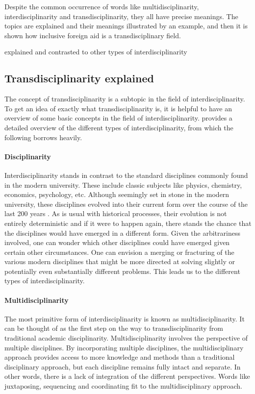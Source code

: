 \documentclass[a4paper]{article}
\begin{document}
Despite the common occurrence of words like multidisciplinarity,
interdisciplinarity and transdisciplinarity, they all have precise meanings.
The topics are explained and their meanings illustrated by an example, and
then it is shown how inclusive foreign aid is a transdisciplinary field.

explained and contrasted to other types
of interdisciplinarity 

\subsection{Transdisciplinarity explained}

The concept of transdisciplinarity is a subtopic in the field of
interdisciplinarity. To get an idea of exactly what transdisciplinarity is, it
is helpful to have an overview of some basic concepts in the field of
interdisciplinarity. \cite{klein2010taxonomy} provides a detailed overview of
the different types of interdisciplinarity, from which the following borrows
heavily.

\paragraph{Disciplinarity}

Interdisciplinarity stands in contrast to the standard disciplines commonly
found in the modern university. These include classic subjects like physics,
chemistry, economics, psychology, etc. Although seemingly set in stone in the
modern university, these disciplines evolved into their current form over the
course of the last 200 years \citep{weingart2010short}. As is usual with
historical processes, their evolution is not entirely deterministic and if it
were to happen again, there stands the chance that the disciplines would have
emerged in a different form. Given the arbitrariness involved, one can wonder
which other disciplines could have emerged given certain other circumstances.
One can envision a merging or fracturing of the various modern disciplines
that might be more directed at solving slightly or potentially even
substantially different problems. This leads us to the different types of
interdisciplinarity.

\paragraph{Multidisciplinarity}

The most primitive form of interdisciplinarity is known as
multidisciplinarity. It can be thought of as the first step on the way to
transdisciplinarity from traditional academic disciplinarity.
Multidisciplinarity involves the perspective of multiple disciplines. By
incorporating multiple disciplines, the multidisciplinary approach provides
access to more knowledge and methods than a traditional disciplinary approach,
but each discipline remains fully intact and separate. In other words, there
is a lack of integration of the different perspectives. Words like
juxtaposing, sequencing and coordinating fit to the multidisciplinary
approach.
\end{document}
